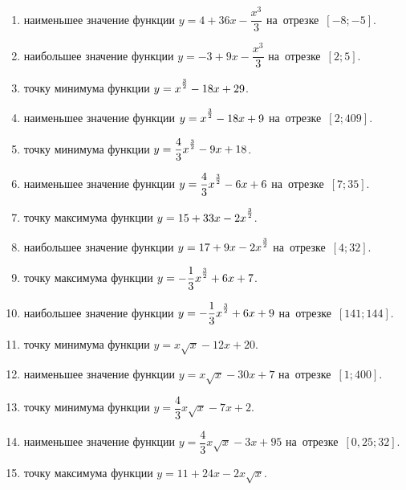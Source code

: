 \documentclass[a4paper,10pt]{article}
\begin{document}
\begin{enumerate}
\item {} наименьшее значение функции $y=4 +36x-\dfrac{x^3}{3}$ на~отрезке~$\left[-8;-5\right]$.

\item {} наибольшее значение функции $y=-3 +9x-\dfrac{x^3}{3}$ на~отрезке~$\left[2;5\right]$.

\item {} точку минимума функции $y=x\strut^{\frac{3}{2}} -18x+29$.

\item {} наименьшее значение функции $y=x\strut^{\frac{3}{2}} -18x+9$ на~отрезке~$\left[2;409\right]$.

\item {} точку минимума функции $y=\dfrac{4}{3}x\strut^{\frac{3}{2}} -9x+18$.

\item {} наименьшее значение функции $y=\dfrac{4}{3}x\strut^{\frac{3}{2}} -6x+6$ на~отрезке~$\left[7;35\right]$.

\item {} точку максимума функции $y=15+33x-2x\strut^{\frac{3}{2}}$.

\item {} наибольшее значение функции $y=17+9x-2x\strut^{\frac{3}{2}}$ на~отрезке~$\left[4;32\right]$.

\item {} точку максимума функции $y=-\dfrac{1}{3}x\strut^{\frac{3}{2}} +6x+7$.

\item {} наибольшее значение функции $y=-\dfrac{1}{3}x\strut^{\frac{3}{2}} +6x+9$ на~отрезке~$\left[141;144\right]$.

\item {} точку минимума функции $y=x\sqrt{x} -12x+20$.

\item {} наименьшее значение функции $y=x\sqrt{x} -30x+7$ на~отрезке~$\left[1;400\right]$.

\item {} точку минимума функции $y=\dfrac{4}{3}x\sqrt{x} -7x+2$.

\item {} наименьшее значение функции $y=\dfrac{4}{3}x\sqrt{x} -3x+95$ на~отрезке~$\left[0,25;32\right]$.

\item {} точку максимума функции $y=11+24x -2x\sqrt{x}$.


\end{enumerate}
\end{document}
